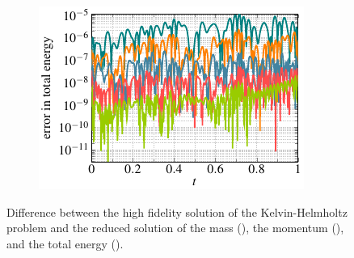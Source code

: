 \begin{figure}
  \begin{subfigure}[]{0.48\linewidth}
            \includegraphics[scale=1]{Figures/paper-figure7.pdf}
   \caption{}
  \label{energy_error_KH}
  \end{subfigure}
\caption{Difference between the high fidelity solution of the Kelvin-Helmholtz problem and the reduced solution of the mass (\protect{}), the momentum (\protect{}), and the total energy (\protect{}).}
\label{fig:conservation_DEIM}
\end{figure}

